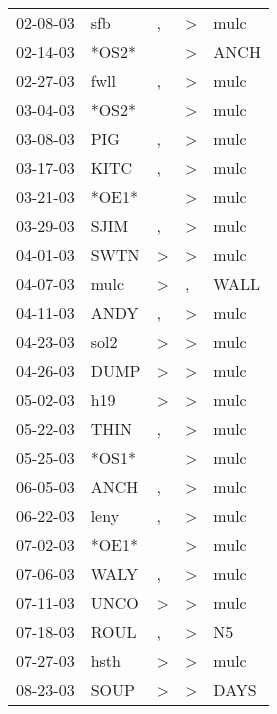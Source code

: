 \begin{supertabular}{lllll}
 02-08-03 &    sfb &                , &     \textgreater &   mulc \\
 02-14-03 &  *OS2* &                  &     \textgreater &   ANCH \\
 02-27-03 &   fwll &                , &     \textgreater &   mulc \\
 03-04-03 &  *OS2* &                  &     \textgreater &   mulc \\
 03-08-03 &    PIG &                , &     \textgreater &   mulc \\
 03-17-03 &   KITC &                , &     \textgreater &   mulc \\
 03-21-03 &  *OE1* &                  &     \textgreater &   mulc \\
 03-29-03 &   SJIM &                , &     \textgreater &   mulc \\
 04-01-03 &   SWTN &     \textgreater &     \textgreater &   mulc \\
 04-07-03 &   mulc &     \textgreater &                , &   WALL \\
 04-11-03 &   ANDY &                , &     \textgreater &   mulc \\
 04-23-03 &   sol2 &     \textgreater &     \textgreater &   mulc \\
 04-26-03 &   DUMP &     \textgreater &     \textgreater &   mulc \\
 05-02-03 &    h19 &     \textgreater &     \textgreater &   mulc \\
 05-22-03 &   THIN &                , &     \textgreater &   mulc \\
 05-25-03 &  *OS1* &                  &     \textgreater &   mulc \\
 06-05-03 &   ANCH &                , &     \textgreater &   mulc \\
 06-22-03 &   leny &                , &     \textgreater &   mulc \\
 07-02-03 &  *OE1* &                  &     \textgreater &   mulc \\
 07-06-03 &   WALY &                , &     \textgreater &   mulc \\
 07-11-03 &   UNCO &     \textgreater &     \textgreater &   mulc \\
 07-18-03 &   ROUL &                , &     \textgreater &     N5 \\
 07-27-03 &   hsth &     \textgreater &     \textgreater &   mulc \\
 08-23-03 &   SOUP &     \textgreater &     \textgreater &   DAYS \\

\end{supertabular}
